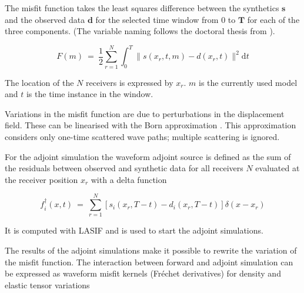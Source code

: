 The misfit function takes the least squares difference between the synthetics $\boldsymbol{s}$ and the 
observed data $\boldsymbol{d}$ for the selected time window from $0$ to $\boldsymbol{T}$ for each of the three components. 
(The variable naming follows the doctoral thesis from \citealp{Magnoni2012}).

\begin{equation}
F(m) \ = \ \frac{1}{2} \sum_{r=1}^N \int_0^T \lVert  s(x_r, t, m) - d(x_r, t)  \lVert^2  \mathrm{d}t
\end{equation}

The location of the $N$ receivers is expressed by $x_r$. $m$ is the currently used model and $t$ is the time instance in the window.



Variations in the misfit function are due to perturbations in the displacement field. 
These can be linearised with the Born approximation \citep{Liu2012}.
This approximation %
considers only one-time scattered wave paths; multiple scattering is ignored.



For the adjoint simulation the waveform adjoint source is defined as the sum of the residuals between observed and 
synthetic data for all receivers $N$ evaluated at the receiver position $x_r$ with a delta function 

\begin{equation}
f_i^{\dagger}(x,t) \ = \ \sum_{r=1}^N [ s_i(x_r, T-t) - d_i(x_r, T-t) ] \delta (x-x_r)
\end{equation}

It is computed with LASIF and is used to start the adjoint simulations.



The results of the adjoint simulations make it possible to rewrite the variation of the misfit function.
The interaction between forward and adjoint simulation can be expressed as waveform misfit kernels (Fr\'{e}chet derivatives)
for density and elastic tensor variations 


